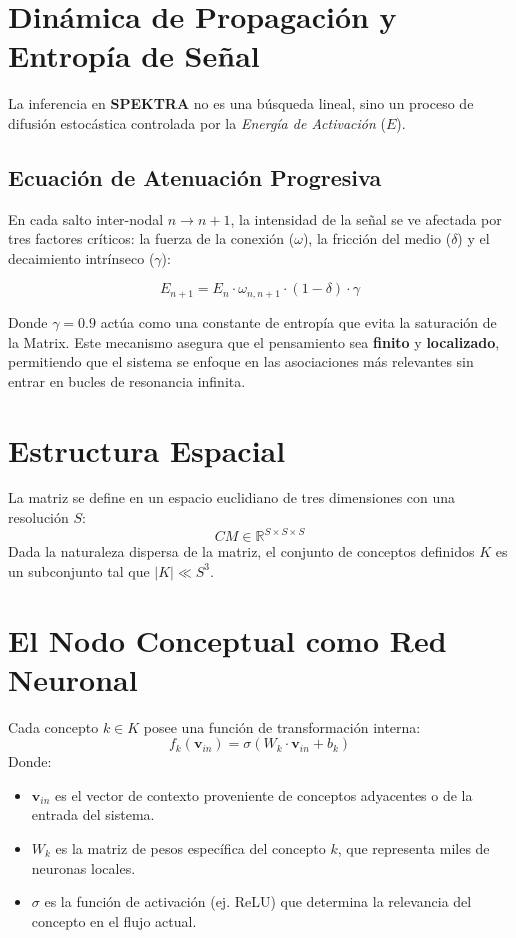 \documentclass[12pt]{article}
\begin{document}
\section{Dinámica de Propagación y Entropía de Señal}

La inferencia en \textbf{SPEKTRA} no es una búsqueda lineal, sino un proceso de difusión estocástica controlada por la \textit{Energía de Activación} ($E$).

\subsection{Ecuación de Atenuación Progresiva}
En cada salto inter-nodal $n \to n+1$, la intensidad de la señal se ve afectada por tres factores críticos: la fuerza de la conexión ($\omega$), la fricción del medio ($\delta$) y el decaimiento intrínseco ($\gamma$):

\begin{equation}
	E_{n+1} = E_n \cdot \omega_{n,n+1} \cdot (1 - \delta) \cdot \gamma
\end{equation}

Donde $\gamma = 0.9$ actúa como una constante de entropía que evita la saturación de la Matrix. Este mecanismo asegura que el pensamiento sea \textbf{finito} y \textbf{localizado}, permitiendo que el sistema se enfoque en las asociaciones más relevantes sin entrar en bucles de resonancia infinita.
















\section{Estructura Espacial}
La matriz se define en un espacio euclidiano de tres dimensiones con una resolución $S$:
$$CM \in \mathbb{R}^{S \times S \times S}$$
Dada la naturaleza dispersa de la matriz, el conjunto de conceptos definidos $K$ es un subconjunto tal que $|K| \ll S^3$.

\section{El Nodo Conceptual como Red Neuronal}
Cada concepto $k \in K$ posee una función de transformación interna:
$$f_k(\mathbf{v}_{in}) = \sigma(W_k \cdot \mathbf{v}_{in} + b_k)$$
Donde:
\begin{itemize}
    \item $\mathbf{v}_{in}$ es el vector de contexto proveniente de conceptos adyacentes o de la entrada del sistema.
    \item $W_k$ es la matriz de pesos específica del concepto $k$, que representa miles de neuronas locales.
    \item $\sigma$ es la función de activación (ej. ReLU) que determina la relevancia del concepto en el flujo actual.
\end{itemize}
\end{document}
